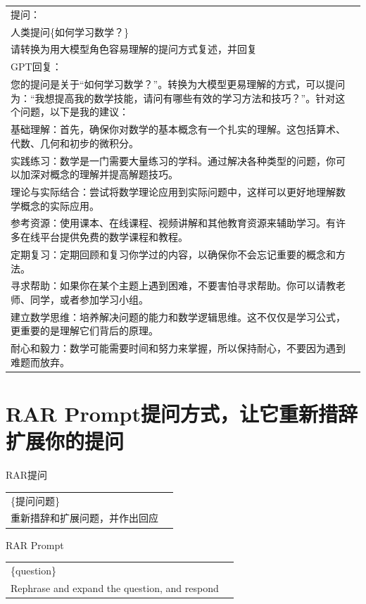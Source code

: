 \documentclass[12pt]{book}
\begin{document}
\begin{tabular}{|p{15cm}|p{3cm}|}
	\hline
提问： \\
人类提问\{如何学习数学？\} \\
请转换为用大模型角色容易理解的提问方式复述，并回复 \\

GPT回复： \\
您的提问是关于“如何学习数学？”。转换为大模型更易理解的方式，可以提问为：“我想提高我的数学技能，请问有哪些有效的学习方法和技巧？”。针对这个问题，以下是我的建议： \\
基础理解：首先，确保你对数学的基本概念有一个扎实的理解。这包括算术、代数、几何和初步的微积分。 \\
实践练习：数学是一门需要大量练习的学科。通过解决各种类型的问题，你可以加深对概念的理解并提高解题技巧。 \\
理论与实际结合：尝试将数学理论应用到实际问题中，这样可以更好地理解数学概念的实际应用。 \\
参考资源：使用课本、在线课程、视频讲解和其他教育资源来辅助学习。有许多在线平台提供免费的数学课程和教程。 \\
定期复习：定期回顾和复习你学过的内容，以确保你不会忘记重要的概念和方法。 \\
寻求帮助：如果你在某个主题上遇到困难，不要害怕寻求帮助。你可以请教老师、同学，或者参加学习小组。 \\
建立数学思维：培养解决问题的能力和数学逻辑思维。这不仅仅是学习公式，更重要的是理解它们背后的原理。 \\
耐心和毅力：数学可能需要时间和努力来掌握，所以保持耐心，不要因为遇到难题而放弃。 \\
	\hline
\end{tabular}



\section{RAR Prompt提问方式，让它重新措辞扩展你的提问}

\bigskip
RAR提问

\begin{tabular}{|p{15cm}|p{3cm}|}
	\hline
\{提问问题\}\\
重新措辞和扩展问题，并作出回应\\
	\hline
\end{tabular}



\bigskip
RAR Prompt

\begin{tabular}{|p{15cm}|p{3cm}|}
	\hline
\{question\}\\
Rephrase and expand the question, and respond\\
	\hline
\end{tabular}
\end{document}
